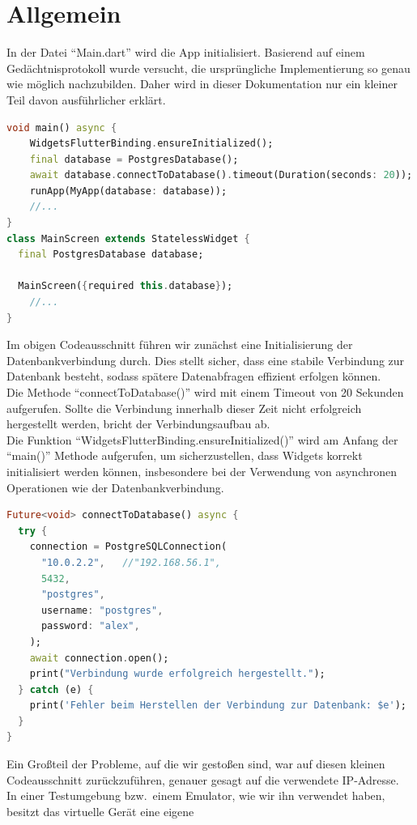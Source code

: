 \documentclass[11pt]{scrartcl}
\begin{document}
\section*{Allgemein}
    In der Datei \enquote{Main.dart} wird die App initialisiert.
    Basierend auf einem Gedächtnisprotokoll wurde versucht, die ursprüngliche Implementierung so genau wie möglich nachzubilden.
    Daher wird in dieser Dokumentation nur ein kleiner Teil davon ausführlicher erklärt.
\begin{lstlisting}[language=Dart]
void main() async {
    WidgetsFlutterBinding.ensureInitialized();
    final database = PostgresDatabase();
    await database.connectToDatabase().timeout(Duration(seconds: 20));
    runApp(MyApp(database: database));
    //...
}
class MainScreen extends StatelessWidget {
  final PostgresDatabase database;

  MainScreen({required this.database});
    //...
}
\end{lstlisting}
    Im obigen Codeausschnitt führen wir zunächst eine Initialisierung der Datenbankverbindung durch.
    Dies stellt sicher, dass eine stabile Verbindung zur Datenbank besteht, sodass spätere
    Datenabfragen effizient erfolgen können. \\
    Die Methode \enquote{connectToDatabase()} wird mit einem Timeout von 20 Sekunden aufgerufen.
    Sollte die Verbindung innerhalb dieser Zeit nicht erfolgreich hergestellt werden,
    bricht der Verbindungsaufbau ab. \\
    Die Funktion \enquote{WidgetsFlutterBinding.ensureInitialized()} wird am Anfang der \enquote{main()} Methode
    aufgerufen, um sicherzustellen, dass Widgets korrekt initialisiert werden können, insbesondere bei der
    Verwendung von asynchronen Operationen wie der Datenbankverbindung.
    \begin{lstlisting}[language=Dart]
Future<void> connectToDatabase() async {
  try {
    connection = PostgreSQLConnection(
      "10.0.2.2",   //"192.168.56.1",
      5432,
      "postgres",
      username: "postgres",
      password: "alex",
    );
    await connection.open();
    print("Verbindung wurde erfolgreich hergestellt.");
  } catch (e) {
    print('Fehler beim Herstellen der Verbindung zur Datenbank: $e');
  }
}
    \end{lstlisting}
    Ein Großteil der Probleme, auf die wir gestoßen sind, war auf diesen kleinen Codeausschnitt zurückzuführen,
    genauer gesagt auf die verwendete IP-Adresse. \\
    In einer Testumgebung bzw.\ einem Emulator, wie wir ihn verwendet haben, besitzt das virtuelle Gerät eine eigene
\end{document}

